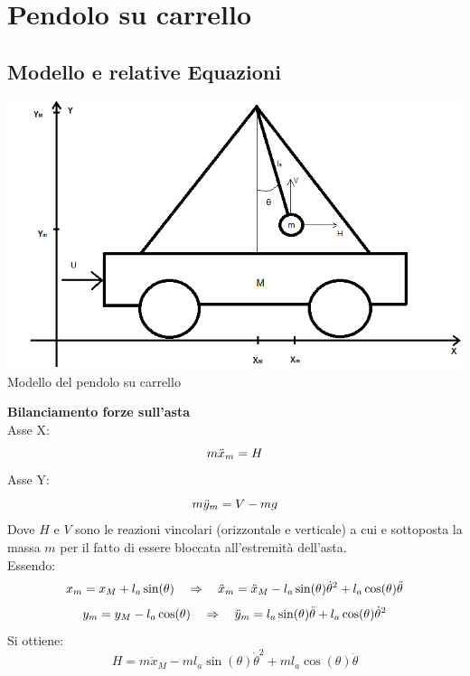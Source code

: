 \chapter{Pendolo su carrello}\label{PendCarrello}
\section{Modello e relative Equazioni}

\begin{center}
	\includegraphics[scale=0.7]{pendolo.png}\\
	{\footnotesize  Modello del pendolo su carrello}\\
\end{center}
\textbf{Bilanciamento forze sull'asta}\\
Asse X:
\begin{equation}\notag
m\ddot{x}_m=H
\end{equation}
Asse Y:
\begin{equation}\notag
m\ddot{y}_m=V-mg
\end{equation}
Dove $H$ e $V$ sono le reazioni vincolari (orizzontale e verticale) a cui e sottoposta la massa $m$ per il fatto di essere bloccata all'estremità dell'asta.\\ 
Essendo:\\
\begin{equation}\notag
x_m = x_M+l_a\sin(\theta) \quad \Rightarrow \quad \ddot{x}_m=\ddot{x}_M-l_a\sin(\theta)\dot{\theta}^2+l_a\cos(\theta)\ddot{\theta}
\end{equation}
\begin{equation}\notag
y_m=y_M-l_a\cos(\theta) \quad \Rightarrow \quad \ddot{y}_m=l_a\sin(\theta)\ddot{\theta}+l_a\cos(\theta)\dot{\theta}^2
\end{equation}
Si ottiene:
\begin{equation}\label{Hv}
H=m\ddot{x}_M-ml_a\sin(\theta)\dot{\theta}^2+ml_a\cos(\theta)\ddot{\theta}
\end{equation}
